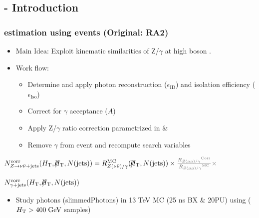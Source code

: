 \documentclass{beamer}
\begin{document}
\subsection{\photonJets - Introduction}
\begin{frame}
\frametitle{\ZInv estimation using \photonJets events \small(Original: RA2)}
\begin{itemize}
 \item Main Idea: Exploit kinematic similarities of Z/$\gamma$ at high boson \pt.
 \item Work flow:
 \begin{itemize}
  \item Determine and apply photon reconstruction ($\epsilon_{\text{ID}}$) and isolation efficiency ($\epsilon_{\text{Iso}}$)
  \item Correct for $\gamma$ acceptance ($A$)
  \item Apply Z/$\gamma$ ratio correction parametrized in \MHT \& \NJets
  \item Remove $\gamma$ from event and recompute search variables
 \end{itemize}
\end{itemize}

$
N_{Z\to\nu\bar\nu\text{+jets}}^{\text{corr}} (\HT, \MHT, \NJets) =
                                                        R^{\text{MC}}_{Z(\nu\bar\nu)/\gamma}
                                                         (\MHT,\NJets) 
                                                        \times
                                                       \textcolor{gray}{\frac{\RZmumugamma^{\text{Corr}}}{\RZmumugamma^{\text{MC}}} \times}$\\
                                                       \begin{center}
                                                        $ N_{\gamma\text{+jets}}^{\text{corr}} (H_{\text{T}},\slash\mkern-12mu{H}_{\text{T}},N(\text{jets}))$
                                                       \end{center}

 \begin{block}{}
 \centering
 \begin{itemize}
  \item Study photons (slimmedPhotons) in 13 TeV MC (25 ns BX \& 20PU) using \photonJets ($H_{\text{T}}>400\;\text{Ge}\kern-0.06667em\text{V}$ samples)
 
 \end{itemize}
 \end{block}

\end{frame}
\end{document}
